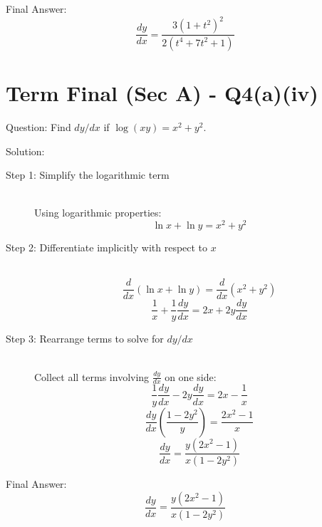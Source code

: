 \documentclass[11pt, a4paper]{article}
\begin{document}
Final Answer:
\[ 
\boxed{\frac{dy}{dx} = \frac{3(1+t^2)^2}{2(t^4 + 7t^2 + 1)}} 
\]



\section*{Term Final (Sec A) - Q4(a)(iv)}

Question:
Find $dy/dx$ if $\log(xy) = x^2 + y^2$.

Solution:

\begin{description}
    \item[Step 1: Simplify the logarithmic term] \ \\
    Using logarithmic properties:
    \[ \ln x + \ln y = x^2 + y^2 \]

    \item[Step 2: Differentiate implicitly with respect to $x$] \ \\
    \[ \frac{d}{dx}(\ln x + \ln y) = \frac{d}{dx}(x^2 + y^2) \]
    \[ \frac{1}{x} + \frac{1}{y} \frac{dy}{dx} = 2x + 2y \frac{dy}{dx} \]

    \item[Step 3: Rearrange terms to solve for $dy/dx$] \ \\
    Collect all terms involving $\frac{dy}{dx}$ on one side:
    \[ \frac{1}{y} \frac{dy}{dx} - 2y \frac{dy}{dx} = 2x - \frac{1}{x} \]
    \[ \frac{dy}{dx} \left( \frac{1 - 2y^2}{y} \right) = \frac{2x^2 - 1}{x} \]
    \[ \frac{dy}{dx} = \frac{y(2x^2 - 1)}{x(1 - 2y^2)} \]
\end{description}

Final Answer:
\[ 
\boxed{\frac{dy}{dx} = \frac{y(2x^2 - 1)}{x(1 - 2y^2)}} 
\]


\end{document}
